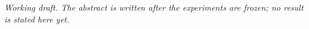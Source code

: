 \emph{Working draft. The abstract is written after the experiments are frozen; no result is stated here yet.}
